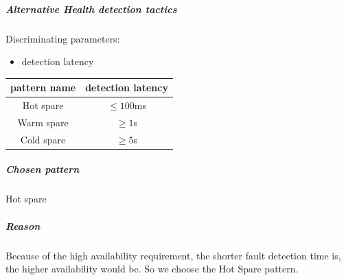 \documentclass{article}
\begin{document}
			\subparagraph{Alternative Health detection tactics}
			Discriminating parameters:
			\begin{itemize}
				\item detection latency
			\end{itemize}
			\begin{center}
				\begin{tabular}{|c|c|}
					\hline
					pattern name & detection latency\\
					\hline
					Hot spare & $\leq 100$ms \\
					\hline
					Warm spare & $\geq 1$s\\
					\hline
					Cold spare & $\geq 5$s\\
					\hline
				\end{tabular}
			\end{center}
			\subparagraph{Chosen pattern} 
			Hot spare
			\subparagraph{Reason} 
			Because of the high availability requirement, the shorter fault detection time is, the higher availability would be. So we choose the Hot Spare pattern.
\end{document}
